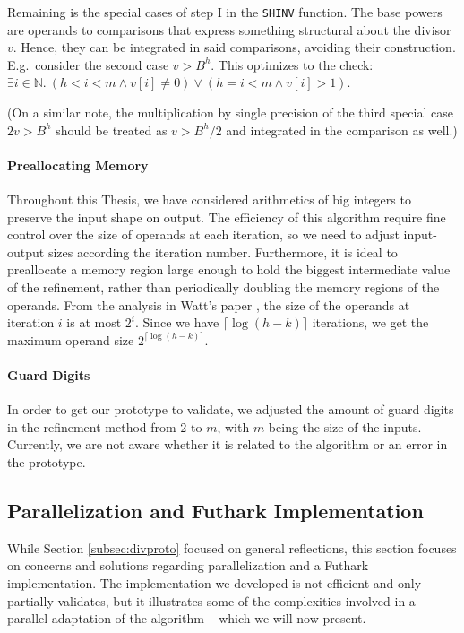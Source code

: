 Remaining is the special cases of step I in the \texttt{SHINV} function. The
base powers are operands to comparisons that express something structural about
the divisor $v$. Hence, they can be integrated in said comparisons, avoiding
their construction.  E.g.\ consider the second case $v > B^h$. This optimizes to
the check: $\exists i\in \mathbb{N}.~(h<i<m \land v[i] \neq 0) \lor (h = i<m \land v[i] > 1)$.

(On a similar note, the multiplication by single precision of the third special
case $2v > B^h$ should be treated as $v > B^h/2$ and integrated in the
comparison as well.)

\paragraph{Preallocating Memory}
Throughout this Thesis, we have considered arithmetics of big integers to preserve
the input shape on output. The efficiency of this algorithm require fine control
over the size of operands at each iteration, so we need to adjust input-output
sizes according the iteration number. Furthermore, it is ideal to
preallocate a memory region large enough to hold the biggest intermediate value
of the refinement, rather than periodically doubling the memory regions of the
operands. From the analysis in Watt's paper \cite{watt2023efficient}, the size
of the operands at iteration $i$ is at most $2^i$. Since we have
$\lceil \log (h-k) \rceil$ iterations, we get the maximum operand size
$2^{\lceil \log (h-k) \rceil}$.


\paragraph{Guard Digits}
In order to get our prototype to validate, we adjusted the amount of guard
digits in the refinement method from $2$ to $m$, with $m$ being the size of the
inputs. Currently, we are not aware whether it is related to the algorithm or an
error in the prototype.

\subsection{Parallelization and Futhark Implementation}
\label{subsec:divfut}

While Section \ref{subsec:divproto} focused on general reflections, this section
focuses on concerns and solutions regarding parallelization and a Futhark
implementation. The implementation we developed is not efficient and only
partially validates, but it illustrates some of the complexities involved in a
parallel adaptation of the algorithm -- which we will now present.

